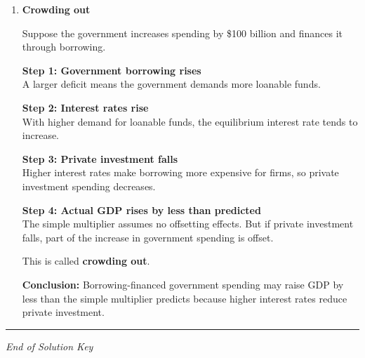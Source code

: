 \documentclass[12pt]{article}
\begin{document}
\begin{enumerate}[label=\textbf{\arabic*.}, start=19]

\item \textbf{Crowding out}

Suppose the government increases spending by \$100 billion and finances it through borrowing.

\textbf{Step 1: Government borrowing rises}\\
A larger deficit means the government demands more loanable funds.

\textbf{Step 2: Interest rates rise}\\
With higher demand for loanable funds, the equilibrium interest rate tends to increase.

\textbf{Step 3: Private investment falls}\\
Higher interest rates make borrowing more expensive for firms, so private investment spending decreases.

\textbf{Step 4: Actual GDP rises by less than predicted}\\
The simple multiplier assumes no offsetting effects. But if private investment falls, part of the increase in government spending is offset.

This is called \textbf{crowding out}.

\textbf{Conclusion:}
Borrowing-financed government spending may raise GDP by less than the simple multiplier predicts because higher interest rates reduce private investment.


\end{enumerate}

\hrule
\vspace{1em}

\begin{center}
\textit{End of Solution Key}
\end{center}
\end{document}

